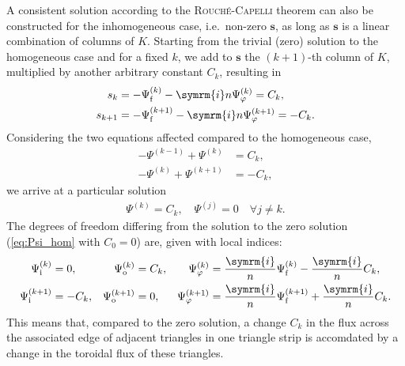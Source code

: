 \documentclass[a4paper, 10pt, english]{article}
\let\temp\varrho
\let\varrho\rho
\let\rho\temp
\let\temp\vartheta
\let\vartheta\theta
\let\theta\temp
\let\temp\varphi
\let\varphi\phi
\let\phi\temp
\let\vec\symbf
\newcommand*\im{\ensuremath{\symrm{i}}}  %
\newcommand*\fs{\ensuremath{\textrm{f}}}  %
\newcommand*\inw{\ensuremath{\textrm{i}}}  %
\newcommand*\out{\ensuremath{\textrm{o}}}  %
\begin{document}
A consistent solution according to the \textsc{Rouché}-\textsc{Capelli} theorem can also be constructed for the inhomogeneous case, i.e.\ non-zero $\vec{s}$, as long as $\vec{s}$ is a linear combination of columns of $K$. Starting from the trivial (zero) solution to the homogeneous case and for a fixed $k$, we add to $\vec{s}$ the $(k+1)$-th column of $K$, multiplied by another arbitrary constant $C_{k}$, resulting in
\begin{align}
  s_{k} &= -\Psi_{\fs}^{(k)} - \im n \Psi_{\phi}^{(k)} = C_{k}, \\
  s_{k+1} &= -\Psi_{\fs}^{(k+1)} - \im n \Psi_{\phi}^{(k+1)} = -C_{k}.
\end{align}
Considering the two equations affected compared to the homogeneous case,
\begin{align}
  -\Psi^{(k-1)} + \Psi^{(k)} &= C_{k}, \\
  -\Psi^{(k)} + \Psi^{(k+1)} &= -C_{k},
\end{align}
we arrive at a particular solution
\begin{gather}
  \Psi^{(k)} = C_{k}, \quad \Psi^{(j)} = 0 \quad \forall j \neq k.
\end{gather}
The degrees of freedom differing from the solution to the zero solution (\cref{eq:Psi_hom} with $C_{0} = 0$) are, given with local indices:
\begin{align}
  \Psi_{\inw}^{(k)} &= 0, & \Psi_{\out}^{(k)} &= C_{k}, & \Psi_{\phi}^{(k)} &= \frac{\im}{n} \Psi_{\fs}^{(k)} - \frac{\im}{n} C_{k}, \\
  \Psi_{\inw}^{(k+1)} &= -C_{k}, & \Psi_{\out}^{(k+1)} &= 0, & \Psi_{\phi}^{(k+1)} &= \frac{\im}{n} \Psi_{\fs}^{(k+1)} + \frac{\im}{n} C_{k}.
\end{align}
This means that, compared to the zero solution, a change $C_{k}$ in the flux across the associated edge of adjacent triangles in one triangle strip is accomdated by a change in the toroidal flux of these triangles.
\end{document}
